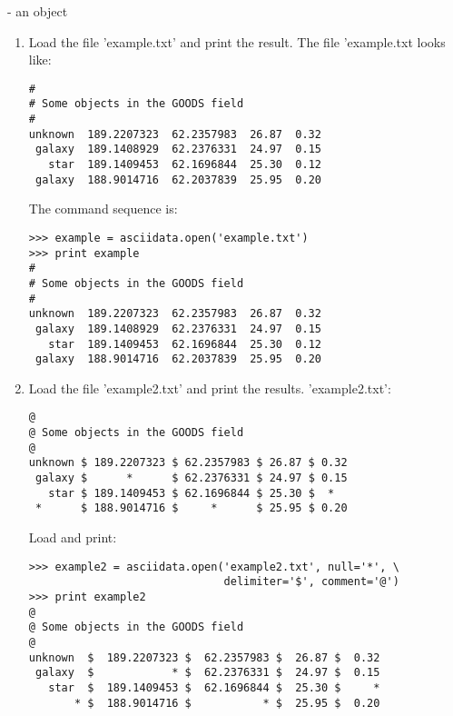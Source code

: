 - an \ad object

\begin{enumerate}
\item Load the file 'example.txt' and print the result. The file 'example.txt
looks like:
\begin{small}
\begin{verbatim}
#
# Some objects in the GOODS field
#
unknown  189.2207323  62.2357983  26.87  0.32
 galaxy  189.1408929  62.2376331  24.97  0.15
   star  189.1409453  62.1696844  25.30  0.12
 galaxy  188.9014716  62.2037839  25.95  0.20
\end{verbatim}
\end{small}
The command sequence is:
\begin{small}
\begin{verbatim}
>>> example = asciidata.open('example.txt')
>>> print example
#
# Some objects in the GOODS field
#
unknown  189.2207323  62.2357983  26.87  0.32
 galaxy  189.1408929  62.2376331  24.97  0.15
   star  189.1409453  62.1696844  25.30  0.12
 galaxy  188.9014716  62.2037839  25.95  0.20
\end{verbatim}
\end{small}

\item Load the file 'example2.txt' and print the results. 'example2.txt':
\begin{small}
\begin{verbatim}
@
@ Some objects in the GOODS field
@
unknown $ 189.2207323 $ 62.2357983 $ 26.87 $ 0.32
 galaxy $      *      $ 62.2376331 $ 24.97 $ 0.15
   star $ 189.1409453 $ 62.1696844 $ 25.30 $  *
 *      $ 188.9014716 $     *      $ 25.95 $ 0.20
\end{verbatim}
\end{small}

Load and print:
\begin{small}
\begin{verbatim}
>>> example2 = asciidata.open('example2.txt', null='*', \
                              delimiter='$', comment='@')
>>> print example2
@
@ Some objects in the GOODS field
@
unknown  $  189.2207323 $  62.2357983 $  26.87 $  0.32
 galaxy  $            * $  62.2376331 $  24.97 $  0.15
   star  $  189.1409453 $  62.1696844 $  25.30 $     *
       * $  188.9014716 $           * $  25.95 $  0.20
\end{verbatim}
\end{small}

\end{enumerate}

